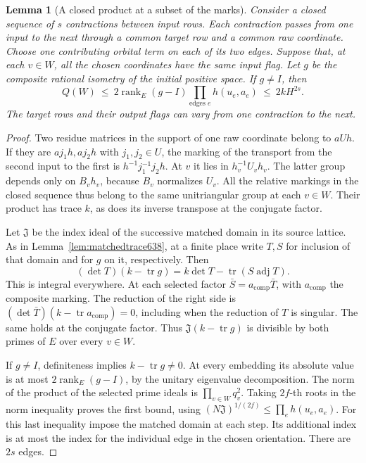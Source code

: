 \documentclass[a4paper,11pt]{article}
\newtheorem{lemma}[proposition]{Lemma}
\theoremstyle{definition}
\theoremstyle{remark}
\numberwithin{equation}{section}
\begin{document}
\begin{lemma}[A closed product at a subset of the marks]
\leavevmode\label{lem:partialcycle653}
Consider a closed sequence of \(s\) contractions between input
rows. Each contraction passes from one input to the next
through a common target row and a common raw coordinate.
Choose one contributing orbital term on each of its two
edges. Suppose that, at each \(v\in W\), all the chosen
coordinates have the same input flag. Let \(g\) be the
composite rational isometry of the initial positive space.
If \(g\ne I\), then
\[
           Q(W)\ \le\ 2\operatorname{rank}_E(g-I)
                    \prod_{\text{edges }e}h(u_e,a_e)
                    \ \le\ 2kH^{2s}.
\]
The target rows and their output flags can vary from one
contraction to the next.
\end{lemma}
\begin{proof}
Two residue matrices in the support of one raw coordinate
belong to \(aUh\). If they are \(a j_1 h,a j_2 h\) with
\(j_1,j_2\in U\), the marking of the transport from the
second input to the first is \(h^{-1}j_1^{-1}j_2h\).
At \(v\) it lies in \(h_v^{-1}U_vh_v\). The latter group
depends only on \(B_vh_v\), because \(B_v\) normalizes \(U_v\).
All the relative markings in the closed sequence thus belong
to the same unitriangular group at each \(v\in W\). Their
product has trace \(k\), as does its inverse transpose at the
conjugate factor.

Let \(\mathfrak J\) be the index ideal of the successive
matched domain in its source lattice. As in
Lemma~\ref{lem:matchedtrace638}, at a finite place write
\(T,S\) for inclusion of that domain and for \(g\) on it,
respectively. Then
\[
  (\det T)(k-\operatorname{tr}g)
       =k\det T-\operatorname{tr}(S\operatorname{adj}T).
\]
This is integral everywhere. At each selected factor
\(\bar S=a_{\mathrm{comp}}\bar T\), with \(a_{\mathrm{comp}}\)
the composite marking. The reduction of the right side is
\((\det\bar T)(k-\operatorname{tr}a_{\mathrm{comp}})=0\),
including when the reduction of \(T\) is singular. The same
holds at the conjugate factor. Thus
\(\mathfrak J(k-\operatorname{tr}g)\) is divisible by both
primes of \(E\) over every \(v\in W\).

If \(g\ne I\), definiteness implies \(k-\operatorname{tr}g\ne0\).
At every embedding its absolute value is at most
\(2\operatorname{rank}_E(g-I)\), by the unitary eigenvalue
decomposition. The norm of the product of the selected prime
ideals is \(\prod_{v\in W}q_v^2\). Taking \(2f\)-th roots
in the norm inequality proves the first bound, using
\((N\mathfrak J)^{1/(2f)}\le\prod_e h(u_e,a_e)\). For this
last inequality impose the matched domain at each step. Its
additional index is at most the index for the individual
edge in the chosen orientation. There are \(2s\) edges.
\end{proof}
\end{document}
